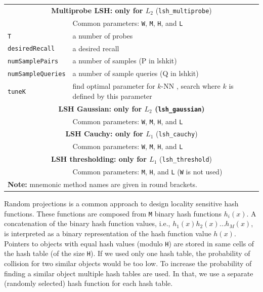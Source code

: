 \documentclass[runningheads,a4paper]{llncs}
\newcommand{\ttt}[1]{\texttt{#1}}
\newcommand{\knn}{$k$-NN }
\begin{document}
{\begin{table}[t!]
\begin{tabular}{l@{\hspace{2mm}}p{3.5in}}
\cmidrule(l){1-2} 
\multicolumn{2}{c}{
\textbf{Multiprobe LSH: only for $L_2$} (\ttt{lsh\_multiprobe}) \cite{lv2007multi,Dong_et_al:2008,dong2011high} } \\
\cmidrule(l){1-2} 
                   & Common parameters: \ttt{W}, \ttt{M}, \ttt{H}, and \ttt{L} \\
\ttt{T}            & a number of probes \\
\ttt{desiredRecall}& a desired recall \\
\ttt{numSamplePairs}& a number of samples (P in lshkit)\\
\ttt{numSampleQueries}& a number of sample queries (Q in lshkit)\\
\ttt{tuneK}        & find optimal parameter for \knn, search
                     where $k$ is defined by this parameter \\
\cmidrule(l){1-2} 
\multicolumn{2}{c}{\textbf{LSH Gaussian: only for $L_2$  (\ttt{lsh\_gaussian}) } \cite{charikar2002similarity}}\\
\cmidrule(l){1-2} 
                   & Common parameters: \ttt{W}, \ttt{M}, \ttt{H}, and \ttt{L} \\
\cmidrule(l){1-2} 
\multicolumn{2}{c}{\textbf{LSH Cauchy: only for $L_1$ } (\ttt{lsh\_cauchy}) \cite{charikar2002similarity}} \\
\cmidrule(l){1-2} 
                   & Common parameters: \ttt{W}, \ttt{M}, \ttt{H}, and \ttt{L} \\
\cmidrule(l){1-2} 
\multicolumn{2}{c}{\textbf{LSH thresholding: only for $L_1$ } (\ttt{lsh\_threshold})  \cite{wang2007sizing,lv2004image}} \\
\cmidrule(l){1-2} 
                   & Common parameters: \ttt{M}, \ttt{H}, and \ttt{L} (\ttt{W} is not used)\\
\bottomrule
\multicolumn{2}{l}{\textbf{Note:} mnemonic method names are given in round brackets.}
\end{tabular}
\vspace{2em}
\end{table}


Random projections is a common approach to design locality sensitive hash functions.
These functions are composed from \texttt{M} binary hash functions $h_i(x)$.
A concatenation of the binary hash function values, i.e.,
 $h_1(x) h_2(x) \ldots h_M(x)$, is interpreted as a binary representation of the hash
function value $h(x)$. 
Pointers to objects with equal hash values (modulo \texttt{H})
are stored  in same cells of the hash table (of the size \texttt{H}).
If we used only one hash table, the probability of collision for two similar objects
would be too low. 
To increase the probability of finding a similar object multiple hash tables are used.
In that, we use a separate (randomly selected) hash function for each hash table.

}
\end{document}
